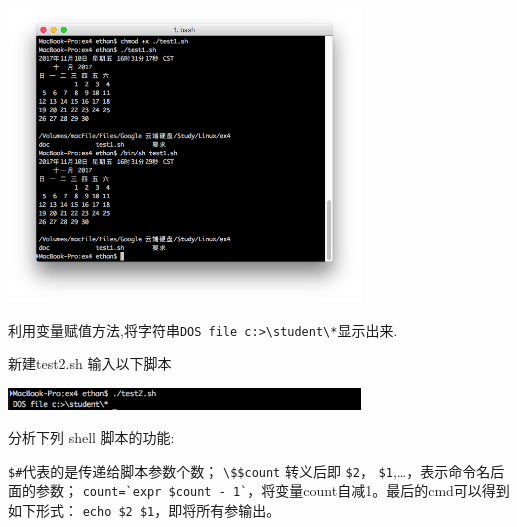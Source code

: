 \documentclass{JNUexp}
\begin{document}
\begin{image}
    \begin{center}
        \includegraphics[width=0.7\textwidth]{1}
    \end{center}
\end{image}



\begin{problem}
    利用变量赋值方法,将字符串\lstinline{DOS file c:>\student\*}显示出来.
\end{problem}

\begin{answer}
    新建test2.sh 输入以下脚本
        
\end{answer}

\begin{image}
    \begin{center}
        \includegraphics[width=0.7\textwidth]{2}
    \end{center}
\end{image}

\begin{problem}
分析下列 shell 脚本的功能:



\end{problem}

\begin{answer}
    \lstinline{$#}代表的是传递给脚本参数个数；
    \lstinline{\$$count} 转义后即
    \lstinline{$2}，
    \lstinline{$1},\ldots，表示命令名后面的参数；
    \lstinline{count=`expr $count - 1`}，将变量count自减1。最后的cmd可以得到如下形式：
    \lstinline{echo $2 $1}，即将所有参输出。
\end{answer}
\end{document}
